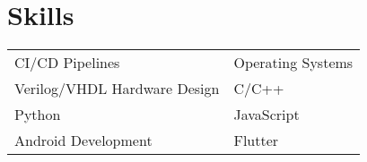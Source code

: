 \documentclass[a4paper,12pt]{article}
\begin{document}
\section{Skills}
\begin{tabularx}{\linewidth}{@{}l X@{}}
CI/CD Pipelines &  Operating Systems \\ Verilog/VHDL Hardware Design & C/C++ \\ Python & JavaScript \\ Android Development & Flutter
\end{tabularx}

\vfill
{}
\end{document}

